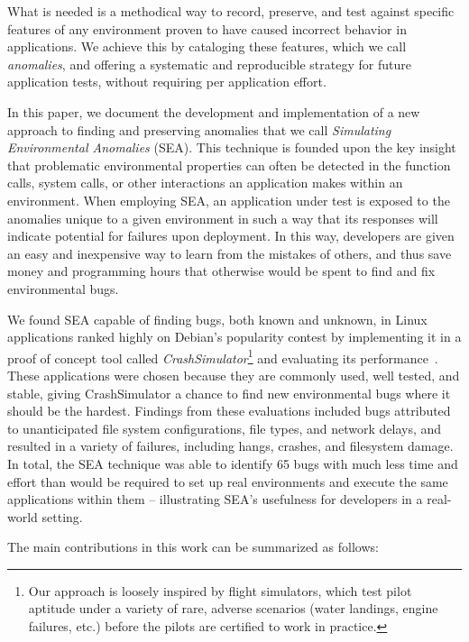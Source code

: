 What is needed is a methodical way to record, preserve, and test against
specific features of any environment proven to have caused incorrect
behavior in applications. We achieve this by cataloging these
features, which we call \textit{anomalies}, and
offering a systematic and reproducible strategy for
future application tests, without
requiring per application effort.

In  this paper, we document the development and implementation of a new
approach to finding and preserving anomalies that we call \textit{Simulating
Environmental Anomalies} (SEA). This technique is founded upon the key
insight that problematic environmental properties can often be detected
in the function calls, system
calls, or other interactions an application makes within an
environment. When employing SEA,
an application under test is exposed
to the anomalies unique to a given environment
in such a way that its responses will indicate
potential for failures upon deployment. In this way, developers are given
an easy and inexpensive way to learn from the mistakes of others, and
thus save money and programming hours that otherwise would be spent to
find and fix environmental bugs.

We found SEA capable of finding bugs,
both known and unknown,
in Linux applications ranked
highly on Debian's popularity contest
by implementing it in a proof of concept tool
called {\em CrashSimulator}\footnote{Our approach is
loosely inspired by flight simulators, which test pilot aptitude under a
variety of rare, adverse scenarios (water landings, engine failures,
etc.) before the pilots are certified to work in practice.}
and evaluating its performance~\cite{DebPopCon}.
These applications were chosen
because they are commonly used,
well tested,
and stable, giving CrashSimulator a chance to find new
environmental bugs where it should be the hardest.
Findings from these evaluations included bugs
attributed to
unanticipated file system configurations, file types, and network delays,
and resulted in a variety of failures, including hangs, crashes, and
filesystem damage.  In total, the SEA technique was able to identify 65
bugs with much less
time and effort than would be required to set up real environments and
execute the same applications within them -- illustrating SEA's
usefulness for developers in a real-world setting.

The main contributions in this work can be summarized as follows:

